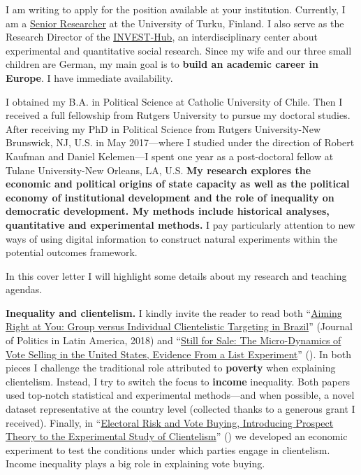 \vspace{-0.3cm}I am writing to apply for the position available at your institution. Currently, I am a \href{https://www.utu.fi/en/people/hector-bahamonde-norambuena}{Senior Researcher} at the University of Turku, Finland. I also serve as the Research Director of the \href{https://www.utu.fi/en/investhub}{INVEST-Hub}, an interdisciplinary center about experimental and quantitative social research. Since my wife and our three small children are German, my main goal is to {\bf build an academic career in Europe}. I have immediate availability.%

I obtained my B.A. in Political Science at Catholic University of Chile. Then I received a full fellowship from Rutgers University to pursue my doctoral studies. After receiving my PhD in Political Science from Rutgers University-New Brunswick, NJ, U.S. in May 2017---where I studied under the direction of Robert Kaufman and Daniel Kelemen---I spent one year as a post-doctoral fellow at Tulane University-New Orleans, LA, U.S. {\bf My research explores the economic and political origins of state capacity as well as the political economy of institutional development and the role of inequality on democratic development. My methods include historical analyses, quantitative and experimental methods.} I pay particularly attention to new ways of using digital information to construct natural experiments within the potential outcomes framework. 

In this cover letter I will highlight some details about my research and teaching agendas.

{\bf Inequality and clientelism.} I kindly invite the reader to read both ``\href{https://journals.sub.uni-hamburg.de/giga/jpla/article/view/1121/1128}{Aiming Right at You: Group versus Individual Clientelistic Targeting in Brazil}'' (Journal of Politics in Latin America, 2018) and ``\href{https://doi.org/10.1057/s41269-020-00174-4}{Still for Sale: The Micro-Dynamics of Vote Selling in the United States, Evidence From a List Experiment}'' ({\unskip}). In both pieces I challenge the traditional role attributed to {\bf poverty} when explaining clientelism. Instead, I try to switch the focus to {\bf income} inequality. Both papers used top-notch statistical and experimental methods---and when possible, a novel dataset representative at the country level (collected thanks to a generous grant I received). Finally, in ``\href{https://doi.org/10.1016/j.electstud.2022.102497}{Electoral Risk and Vote Buying, Introducing Prospect Theory to the Experimental Study of Clientelism}'' ({\unskip}) we developed an economic experiment to test the conditions under which parties engage in clientelism. Income inequality plays a big role in explaining vote buying.

